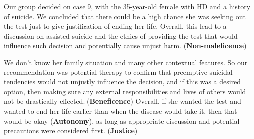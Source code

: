 \documentclass[plain,basic]{inVerba-notes}
\begin{document}
Our group decided on case 9, with the 35-year-old female with HD and a history of suicide. We concluded that there could be a high chance she was seeking out the test just to give justification of ending her life. Overall, this lead to a discussion on assisted suicide and the ethics of providing the test that would influence such decision and potentially cause unjust harm. (\textbf{Non-maleficence})

We don't know her family situation and many other contextual features. So our recommendation was potential therapy to confirm that preemptive suicidal tendencies would not unjustly influence the decision, and if this was a desired option, then making sure any external responsibilities and lives of others would not be drastically effected. (\textbf{Beneficence}) Overall, if she wanted the test and wanted to end her life earlier than when the disease would take it, then that would be okay (\textbf{Autonomy}), as long as appropriate discussion and potential precautions were considered first. (\textbf{Justice})




\end{document}

